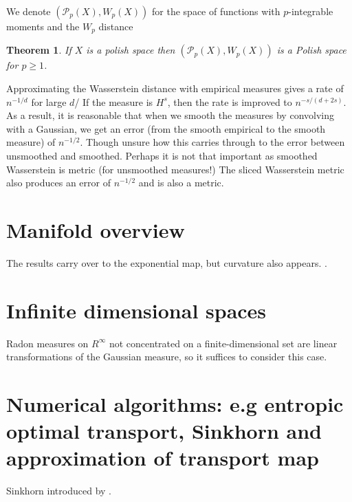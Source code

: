 \documentclass[
    a4paper,
    DIV=14,
    abstract=true,
    numbers=noenddot
]
{scrartcl}
\newtheorem{theorem}{Theorem}[section]
\theoremstyle{definition}
\newcommand{\Pp}{\mathcal{P}}
\begin{document}
We denote $(\Pp_p(X), W_p(X))$ for the space of functions with $p$-integrable moments and the $W_p$ distance \cite[Theorem..]{bogachev2012monge}
\begin{theorem}
If $X$ is a polish space then $(\Pp_p(X), W_p(X))$ is a Polish space for $p \geq 1$. 
\end{theorem}
Approximating the Wasserstein distance with empirical measures gives a rate of $n^{-1/d}$ for large $d$/ If the measure is $H^s$, then the rate is improved to $n^{-s/(d+2s)}$. As a result, it is reasonable that when we smooth the measures by convolving with a Gaussian, we get an error (from the smooth empirical to the smooth measure) of $n^{-1/2}$. Though unsure how this carries through to the error between unsmoothed and smoothed. Perhaps it is not that important as smoothed Wasserstein is metric (for unsmoothed measures!) The sliced Wasserstein metric also produces an error of $n^{-1/2}$ and is also a metric.         

  
\section{Manifold overview}
The results carry over to the exponential map, but curvature also appears.
\cite{bogachev2012monge}.
\section{Infinite dimensional spaces}
Radon measures on $R^ \infty$ not concentrated on a finite-dimensional set are linear transformations of the Gaussian measure, so it suffices to consider this case.  

\section{Numerical algorithms: e.g entropic optimal transport, Sinkhorn and approximation of transport map}
Sinkhorn introduced by \cite[]{cuturi2014fast}.

 




\end{document}
